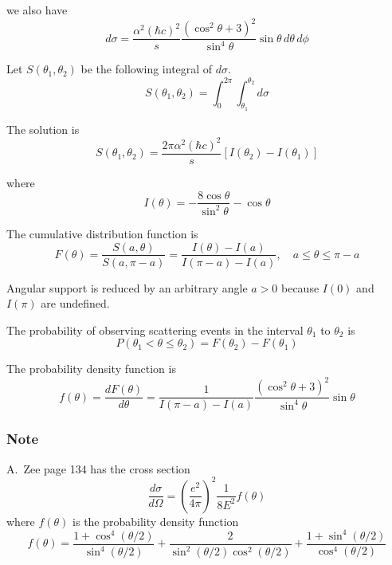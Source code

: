 we also have
\begin{equation*}
d\sigma=\frac{\alpha^2(\hbar c)^2}{s}
\frac{(\cos^2\theta+3)^2}{\sin^4\theta}
\sin\theta\,d\theta\,d\phi
\end{equation*}

Let $S(\theta_1,\theta_2)$ be the following integral of $d\sigma$.
\begin{equation*}
S(\theta_1,\theta_2)=\int_0^{2\pi}\int_{\theta_1}^{\theta_2}d\sigma
\end{equation*}

The solution is
\begin{equation*}
S(\theta_1,\theta_2)=\frac{2\pi\alpha^2(\hbar c)^2}{s}[I(\theta_2)-I(\theta_1)]
\end{equation*}

where
\begin{equation*}
I(\theta)=-\frac{8\cos\theta}{\sin^2\theta}-\cos\theta
\end{equation*}

The cumulative distribution function is
\begin{equation*}
F(\theta)
=\frac{S(a,\theta)}{S(a,\pi-a)}
=\frac{I(\theta)-I(a)}{I(\pi-a)-I(a)},
\quad
a\le\theta\le\pi-a
\end{equation*}

Angular support is reduced by an arbitrary angle $a>0$ because $I(0)$ and $I(\pi)$ are undefined.

\bigskip
The probability of observing scattering events in the interval $\theta_1$ to $\theta_2$ is
\begin{equation*}
P(\theta_1<\theta\le\theta_2)=F(\theta_2)-F(\theta_1)
\end{equation*}

The probability density function is
\begin{equation*}
f(\theta)=\frac{dF(\theta)}{d\theta}
=\frac{1}{I(\pi-a)-I(a)}
\frac{\left(\cos^2\theta+3\right)^2}{\sin^4\theta}\sin\theta
\end{equation*}

\subsubsection*{Note}

A.~Zee page 134 has the cross section
\begin{equation*}
\frac{d\sigma}{d\Omega}=\left(\frac{e^2}{4\pi}\right)^2\frac{1}{8E^2}f(\theta)
\end{equation*}
where $f(\theta)$ is the probability density function
\begin{equation*}
f(\theta)=
\frac{1+\cos^4(\theta/2)}{\sin^4(\theta/2)}
+\frac{2}{\sin^2(\theta/2)\cos^2(\theta/2)}
+\frac{1+\sin^4(\theta/2)}{\cos^4(\theta/2)}
\end{equation*}

